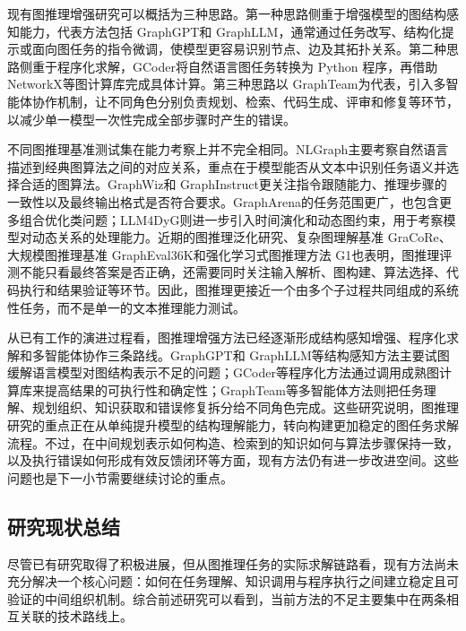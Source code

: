现有图推理增强研究可以概括为三种思路。第一种思路侧重于增强模型的图结构感知能力，代表方法包括 GraphGPT\cite{tang2024graphgpt}和 GraphLLM\cite{chai2023graphllm}，通常通过任务改写、结构化提示或面向图任务的指令微调，使模型更容易识别节点、边及其拓扑关系。第二种思路侧重于程序化求解，GCoder\cite{zhang2025gcoder}将自然语言图任务转换为 Python 程序，再借助 NetworkX\cite{hagberg2008networkx}等图计算库完成具体计算。第三种思路以 GraphTeam\cite{li2024graphteam}为代表，引入多智能体协作机制，让不同角色分别负责规划、检索、代码生成、评审和修复等环节，以减少单一模型一次性完成全部步骤时产生的错误。

不同图推理基准测试集在能力考察上并不完全相同。NLGraph\cite{chen2024nlgraph}主要考察自然语言描述到经典图算法之间的对应关系，重点在于模型能否从文本中识别任务语义并选择合适的图算法。GraphWiz\cite{gong2024graphwiz}和 GraphInstruct\cite{graphinstruct2024}更关注指令跟随能力、推理步骤的一致性以及最终输出格式是否符合要求。GraphArena\cite{tang2025grapharena}的任务范围更广，也包含更多组合优化类问题；LLM4DyG\cite{llm4dyg2024}则进一步引入时间演化和动态图约束，用于考察模型对动态关系的处理能力。近期的图推理泛化研究\cite{zhang2024memorization}、复杂图理解基准 GraCoRe\cite{yuan2024gracore}、大规模图推理基准 GraphEval36K\cite{wu2025grapheval36k}和强化学习式图推理方法 G1\cite{guo2025g1}也表明，图推理评测不能只看最终答案是否正确，还需要同时关注输入解析、图构建、算法选择、代码执行和结果验证等环节。因此，图推理更接近一个由多个子过程共同组成的系统性任务，而不是单一的文本推理能力测试。

从已有工作的演进过程看，图推理增强方法已经逐渐形成结构感知增强、程序化求解和多智能体协作三条路线。GraphGPT\cite{tang2024graphgpt}和 GraphLLM\cite{chai2023graphllm}等结构感知方法主要试图缓解语言模型对图结构表示不足的问题；GCoder\cite{zhang2025gcoder}等程序化方法通过调用成熟图计算库来提高结果的可执行性和确定性；GraphTeam\cite{li2024graphteam}等多智能体方法则把任务理解、规划组织、知识获取和错误修复拆分给不同角色完成。这些研究说明，图推理研究的重点正在从单纯提升模型的结构理解能力，转向构建更加稳定的图任务求解流程。不过，在中间规划表示如何构造、检索到的知识如何与算法步骤保持一致，以及执行错误如何形成有效反馈闭环等方面，现有方法仍有进一步改进空间。这些问题也是下一小节需要继续讨论的重点。

\subsection{研究现状总结}

尽管已有研究取得了积极进展，但从图推理任务的实际求解链路看，现有方法尚未充分解决一个核心问题：如何在任务理解、知识调用与程序执行之间建立稳定且可验证的中间组织机制。综合前述研究可以看到，当前方法的不足主要集中在两条相互关联的技术路线上。

